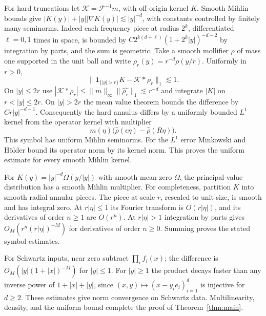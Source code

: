 \documentclass[11pt]{article}
\newcommand{\ind}{\mathbf 1}
\begin{document}
For hard truncations let \(\mathcal K=\mathcal F^{-1}m\), with
off-origin kernel \(K\). Smooth Mihlin bounds give
\(|K(y)|+|y||\nabla K(y)|\lesssim |y|^{-d}\), with constants
controlled by finitely many seminorms. Indeed each frequency piece
at radius \(2^k\), differentiated \(\ell=0,1\) times in space, is
bounded by \(C 2^{k(d+\ell)}(1+2^k|y|)^{-d-2}\) by integration
by parts, and the sum is geometric. Take a smooth mollifier \(\rho\)
of mass one supported in the unit ball and write
\(\rho_r(y)=r^{-d}\rho(y/r)\). Uniformly in \(r>0\),
\[
       \|\ind_{\{|y|>r\}}K-\mathcal K*\rho_r\|_1\lesssim 1.
\]
On \(|y|\le2r\) use
\(|\mathcal K*\rho_r|\le\|m\|_\infty\|\widehat{\rho_r}\|_1
\lesssim r^{-d}\) and integrate \(|K|\) on \(r<|y|\le2r\).
On \(|y|>2r\) the mean value theorem bounds the difference by
\(Cr|y|^{-d-1}\). Consequently the hard annulus differs by a uniformly
bounded \(L^1\) kernel from the operator kernel with multiplier
\[
          m(\eta)\big(\widehat\rho(\epsilon\eta)-\widehat\rho(R\eta)\big).
\]
This symbol has uniform Mihlin seminorms. For the \(L^1\) error
Minkowski and H\"older bound its operator norm by its kernel norm.
This proves the uniform estimate for every smooth Mihlin kernel.

For \(K(y)=|y|^{-d}\Omega(y/|y|)\) with smooth mean-zero \(\Omega\),
the principal-value distribution has a smooth Mihlin multiplier.
For completeness, partition \(K\) into smooth radial annular pieces.
The piece at scale \(r\), rescaled to unit size, is smooth and has
integral zero. At \(r|\eta|\le1\) its Fourier transform is
\(O(r|\eta|)\), and its derivatives of order \(n\ge1\) are \(O(r^n)\).
At \(r|\eta|>1\) integration by parts gives
\(O_M(r^n(r|\eta|)^{-M})\) for derivatives of order \(n\ge0\).
Summing proves the stated symbol estimates.

For Schwartz inputs, near zero subtract \(\prod_i f_i(x)\);
the difference is \(O_M(|y|(1+|x|)^{-M})\) for \(|y|\le1\).
For \(|y|\ge1\) the product decays faster than any inverse power
of \(1+|x|+|y|\), since \((x,y)\mapsto(x-y_i e_i)_{i=1}^d\)
is injective for \(d\ge2\). These estimates give norm convergence
on Schwartz data. Multilinearity, density, and the uniform bound
complete the proof of Theorem~\ref{thm:main}.
\end{document}
